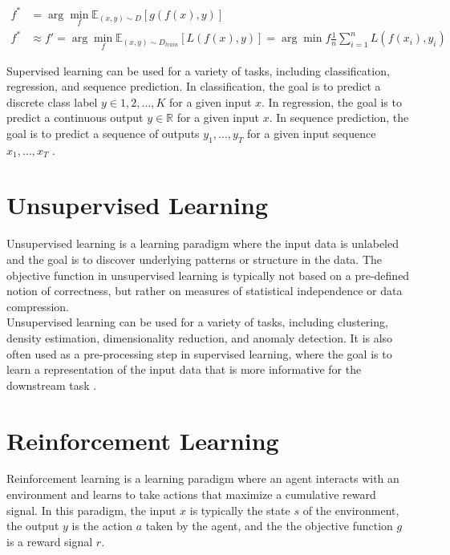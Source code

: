\begin{equation}
\begin{aligned}
f^* &= \arg\min_{f} \mathbb{E}_{(x,y) \sim D}[g(f(x), y)] \\
f^* &\approx f' = \arg\min_{f} \mathbb{E}_{(x,y) \sim D_{train}}[L(f(x),y)] = \arg\min{f} \frac{1}{n}\sum_{i=1}^n L(f(x_i),y_i)
\end{aligned}
\end{equation}


Supervised learning can be used for a variety of tasks, including classification, regression, and sequence prediction. In classification, 
the goal is to predict a discrete class label $y \in {1,2,\ldots,K}$ for a given input $x$. In regression, the goal is to predict a continuous 
output $y \in \mathbb{R}$ for a given input $x$. In sequence prediction, the goal is to predict a sequence of outputs $y_1,\ldots,y_T$ for a 
given input sequence $x_1,\ldots,x_T$ \cite[chapter~4]{bishop} \cite[chapter~5, chapter~6]{Goodfellow}.

\section{Unsupervised Learning}
\label{section:unsup_learn}
Unsupervised learning is a learning paradigm where the input data is unlabeled and the goal is to discover underlying patterns or structure in the data.
The objective function in unsupervised learning is typically not based on a pre-defined notion of correctness, but rather on measures of statistical
independence or data compression.\\

Unsupervised learning can be used for a variety of tasks, including clustering, density estimation, dimensionality reduction, and anomaly detection.
It is also often used as a pre-processing step in supervised learning, where the goal is to learn a representation of the input data that is more informative
for the downstream task \cite[chapter~9]{bishop} \cite[chapter~5]{Goodfellow}. 

\section{Reinforcement Learning}
\label{section:rl}

Reinforcement learning is a learning paradigm where an agent interacts with an environment and learns to take actions that maximize a 
cumulative reward signal. In this paradigm, the input $x$ is typically the state $s$ of the environment, the output $y$ is the action $a$ taken by the agent, 
and the the objective function $g$ is a reward signal $r$.

